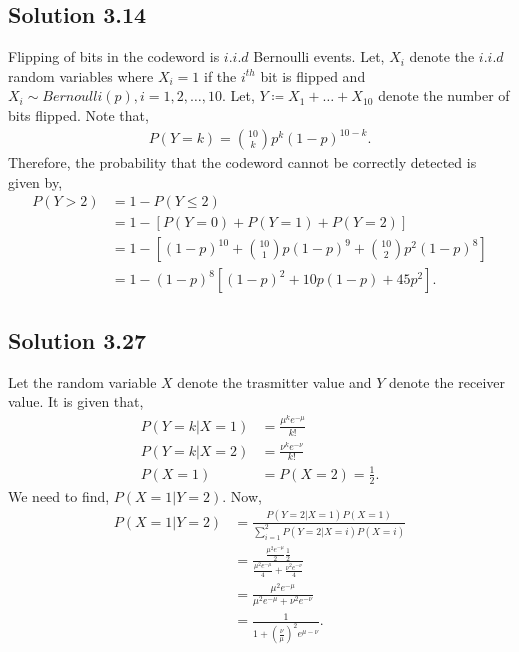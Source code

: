 \subsection*{Solution 3.14}
Flipping of bits in the codeword is $i.i.d$ Bernoulli events. Let, $X_i$ denote the $i.i.d$ random variables where $X_i = 1$ if the $i^{th}$ bit is flipped and $X_i \sim Bernoulli(p), i=1,2,\ldots,10$. Let, $Y \coloneqq X_1+\ldots+X_{10}$ denote the number of bits flipped. Note that,
\begin{align*}
	P(Y=k) = {10 \choose k}p^k(1-p)^{10-k}.
\end{align*} 
Therefore, the probability that the codeword cannot be correctly detected is given by,
\begin{align*}
	P(Y > 2) &= 1- P(Y \leq 2)\\
	&= 1-[P(Y=0) + P(Y=1) + P(Y=2)]\\
	&= 1-\left[(1-p)^{10} + {10 \choose 1}p(1-p)^{9} + {10 \choose 2}p^2(1-p)^{8}\right]\\
	&= 1-(1-p)^8\left[(1-p)^2 + 10p(1-p) + 45p^2\right].
\end{align*}
\subsection*{Solution 3.27}
Let the random variable $X$ denote the trasmitter value and $Y$ denote the receiver value. It is given that,
\begin{align*}
	P(Y=k|X=1) &= \frac{\mu^k e^{-\mu}}{k!}\\
	P(Y=k|X=2) &= \frac{\nu^k e^{-\nu}}{k!}\\
	P(X=1) &= P(X=2) = \frac{1}{2}.
\end{align*}
We need to find, $P(X=1 | Y=2)$. Now,
\begin{align*}
	P(X=1 | Y=2) &= \frac{P(Y=2|X=1)P(X=1)}{\sum_{i=1}^2 P(Y=2|X=i)P(X=i)}\\
	&= \frac{\frac{\mu^2 e^{-\mu}}{2}\frac{1}{2}}{\frac{\mu^2 e^{-\mu}}{4} + \frac{\nu^2 e^{-\nu}}{4}}\\
	&= \frac{\mu^2 e^{-\mu}}{\mu^2 e^{-\mu} + \nu^2 e^{-\nu}}\\
	&= \frac{1}{1+(\frac{\nu}{\mu})^2e^{\mu-\nu}}.
\end{align*}